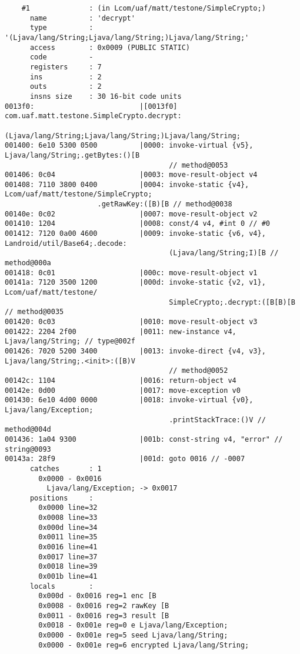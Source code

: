 \begin{lstlisting}
    #1              : (in Lcom/uaf/matt/testone/SimpleCrypto;)
      name          : 'decrypt'
      type          : '(Ljava/lang/String;Ljava/lang/String;)Ljava/lang/String;'
      access        : 0x0009 (PUBLIC STATIC)
      code          -
      registers     : 7
      ins           : 2
      outs          : 2
      insns size    : 30 16-bit code units
0013f0:                         |[0013f0] com.uaf.matt.testone.SimpleCrypto.decrypt:
					    (Ljava/lang/String;Ljava/lang/String;)Ljava/lang/String;
001400: 6e10 5300 0500          |0000: invoke-virtual {v5}, Ljava/lang/String;.getBytes:()[B
                                       // method@0053
001406: 0c04                    |0003: move-result-object v4
001408: 7110 3800 0400          |0004: invoke-static {v4}, Lcom/uaf/matt/testone/SimpleCrypto;
					  .getRawKey:([B)[B // method@0038
00140e: 0c02                    |0007: move-result-object v2
001410: 1204                    |0008: const/4 v4, #int 0 // #0
001412: 7120 0a00 4600          |0009: invoke-static {v6, v4}, Landroid/util/Base64;.decode:
                                       (Ljava/lang/String;I)[B // method@000a
001418: 0c01                    |000c: move-result-object v1
00141a: 7120 3500 1200          |000d: invoke-static {v2, v1}, Lcom/uaf/matt/testone/
                                       SimpleCrypto;.decrypt:([B[B)[B // method@0035
001420: 0c03                    |0010: move-result-object v3
001422: 2204 2f00               |0011: new-instance v4, Ljava/lang/String; // type@002f
001426: 7020 5200 3400          |0013: invoke-direct {v4, v3}, Ljava/lang/String;.<init>:([B)V
                                       // method@0052
00142c: 1104                    |0016: return-object v4
00142e: 0d00                    |0017: move-exception v0
001430: 6e10 4d00 0000          |0018: invoke-virtual {v0}, Ljava/lang/Exception;
                                       .printStackTrace:()V // method@004d
001436: 1a04 9300               |001b: const-string v4, "error" // string@0093
00143a: 28f9                    |001d: goto 0016 // -0007
      catches       : 1
        0x0000 - 0x0016
          Ljava/lang/Exception; -> 0x0017
      positions     :
        0x0000 line=32
        0x0008 line=33
        0x000d line=34
        0x0011 line=35
        0x0016 line=41
        0x0017 line=37
        0x0018 line=39
        0x001b line=41
      locals        :
        0x000d - 0x0016 reg=1 enc [B
        0x0008 - 0x0016 reg=2 rawKey [B
        0x0011 - 0x0016 reg=3 result [B
        0x0018 - 0x001e reg=0 e Ljava/lang/Exception;
        0x0000 - 0x001e reg=5 seed Ljava/lang/String;
        0x0000 - 0x001e reg=6 encrypted Ljava/lang/String;


\end{lstlisting}
